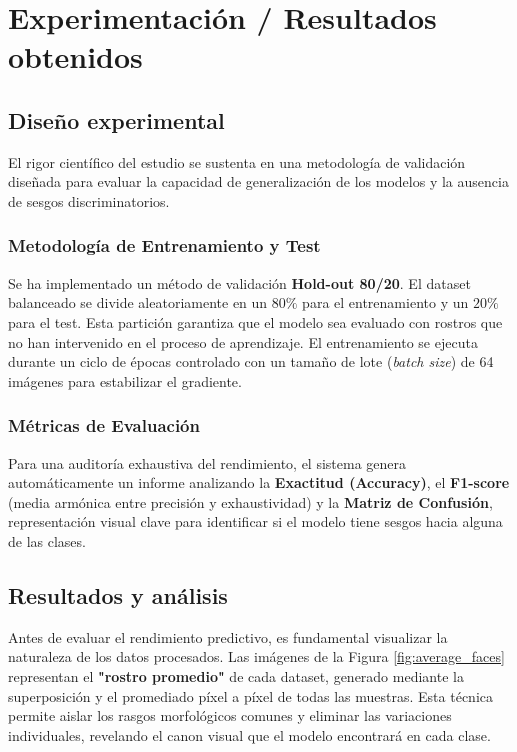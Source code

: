 \section{Experimentación / Resultados obtenidos}

\subsection{Diseño experimental}

El rigor científico del estudio se sustenta en una metodología de validación diseñada para evaluar la capacidad de generalización de los modelos y la ausencia de sesgos discriminatorios.

\subsubsection{Metodología de Entrenamiento y Test}

Se ha implementado un método de validación \textbf{Hold-out 80/20}. El dataset balanceado se divide aleatoriamente en un $80\%$ para el entrenamiento y un $20\%$ para el test. Esta partición garantiza que el modelo sea evaluado con rostros que no han intervenido en el proceso de aprendizaje. El entrenamiento se ejecuta durante un ciclo de épocas controlado con un tamaño de lote (\textit{batch size}) de 64 imágenes para estabilizar el gradiente.

\subsubsection{Métricas de Evaluación}

Para una auditoría exhaustiva del rendimiento, el sistema genera automáticamente un informe analizando la \textbf{Exactitud (Accuracy)}, el \textbf{F1-score} (media armónica entre precisión y exhaustividad) y la \textbf{Matriz de Confusión}, representación visual clave para identificar si el modelo tiene sesgos hacia alguna de las clases.

\subsection{Resultados y análisis}

Antes de evaluar el rendimiento predictivo, es fundamental visualizar la naturaleza de los datos procesados. Las imágenes de la Figura \ref{fig:average_faces} representan el \textbf{"rostro promedio"} de cada dataset, generado mediante la superposición y el promediado píxel a píxel de todas las muestras. Esta técnica permite aislar los rasgos morfológicos comunes y eliminar las variaciones individuales, revelando el canon visual que el modelo encontrará en cada clase.

